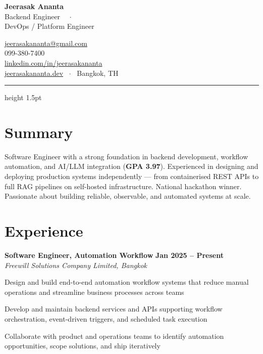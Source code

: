 \documentclass[10pt,a4paper]{article}
\newcommand{\entryhead}[3]{%
  {\bfseries\color{cvdark}#1}\hfill
  {\small\bfseries\color{cvblue}#3}\\[-2pt]
  {\small\color{cvgray}\textit{#2}}\vspace{4pt}%
}
\begin{document}
\begin{minipage}[t]{0.62\linewidth}
  {\fontsize{26}{30}\selectfont\bfseries\color{cvdark}Jeerasak Ananta}\\[3pt]
  {\normalsize\color{cvblue}Backend Engineer \ \ $\cdot$ \\ DevOps / Platform Engineer}
\end{minipage}
\hfill
\begin{minipage}[t]{0.36\linewidth}\raggedleft
  {\small\color{cvgray}
    \href{mailto:jeerasakananta@gmail.com}{jeerasakananta@gmail.com}\\
    099-380-7400\\
    \href{https://linkedin.com/in/jeerasakananta}{linkedin.com/in/jeerasakananta}\\
    \href{https://jeerasakananta.dev}{jeerasakananta.dev} \ $\cdot$ \ Bangkok, TH
  }
\end{minipage}

\vspace{8pt}
{\color{cvblue}\hrule height 1.5pt}
\vspace{10pt}

\section{Summary}

{\small\color{cvdark}
Software Engineer with a strong foundation in backend development, workflow automation,
and AI/LLM integration (\textbf{GPA 3.97}). Experienced in designing and deploying
production systems independently --- from containerised REST APIs to full RAG pipelines
on self-hosted infrastructure. National hackathon winner. Passionate about building
reliable, observable, and automated systems at scale.
}

\section{Experience}

\entryhead{Software Engineer, Automation Workflow}
          {Freewill Solutions Company Limited, Bangkok}{Jan 2025 -- Present}
\begin{cvlist}
  \item Design and build end-to-end automation workflow systems that reduce manual
        operations and streamline business processes across teams
  \item Develop and maintain backend services and APIs supporting workflow orchestration,
        event-driven triggers, and scheduled task execution
  \item Collaborate with product and operations teams to identify automation
        opportunities, scope solutions, and ship iteratively
\end{cvlist}
\end{document}
